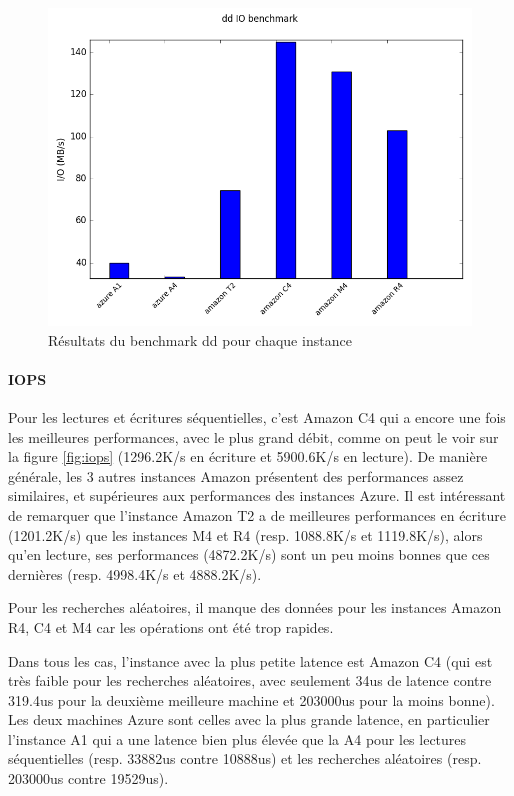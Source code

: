 \begin{figure}[h]
  \begin{center}
    \includegraphics[width=\textwidth]{plot_IO.png}
    \caption{Résultats du benchmark dd pour chaque instance}
    \label{fig:io}
  \end{center}
\end{figure}

\paragraph{IOPS}

Pour les lectures et écritures séquentielles, c'est Amazon C4 qui a encore une fois les meilleures performances, avec le plus grand débit, comme on peut le voir sur la figure \ref{fig:iops} (1296.2K/s en écriture et 5900.6K/s en lecture). De manière générale, les 3 autres instances Amazon présentent des performances assez similaires, et supérieures aux performances des instances Azure. Il est intéressant de remarquer que l'instance Amazon T2 a de meilleures performances en écriture (1201.2K/s) que les instances M4 et R4 (resp. 1088.8K/s et 1119.8K/s), alors qu'en lecture, ses performances (4872.2K/s) sont un peu moins bonnes que ces dernières (resp. 4998.4K/s et 4888.2K/s).

Pour les recherches aléatoires, il manque des données pour les instances Amazon R4, C4 et M4 car les opérations ont été trop rapides.

Dans tous les cas, l'instance avec la plus petite latence est Amazon C4 (qui est très faible pour les recherches aléatoires, avec seulement 34us de latence contre 319.4us pour la deuxième meilleure machine et 203000us pour la moins bonne). Les deux machines Azure sont celles avec la plus grande latence, en particulier l'instance A1 qui a une latence bien plus élevée que la A4 pour les lectures séquentielles (resp. 33882us contre 10888us) et les recherches aléatoires (resp. 203000us contre 19529us).

